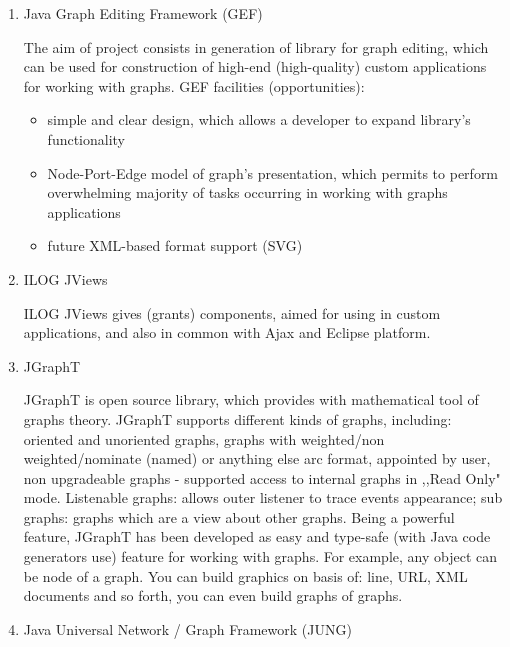 \begin{enumerate}

\item
Java Graph Editing Framework (GEF)~\cite{GEF}

The aim of project consists in generation of library for graph editing, which can be used for construction of high-end (high-quality) custom applications for working with graphs.
GEF facilities (opportunities):
\begin{itemize}
	\item simple and clear design, which allows a developer to expand library's functionality
	\item Node-Port-Edge model of graph's presentation, which permits to perform overwhelming majority of tasks occurring in working with graphs applications
	\item future XML-based format support (SVG)
\end{itemize}

\item
ILOG JViews~\cite{ILOG_Jview}

ILOG JViews gives (grants) components, aimed for using in custom applications, and also in common with Ajax and Eclipse platform.

\item
JGraphT~\cite{JGraphT}

JGraphT is open source library, which provides with mathematical tool of graphs theory. JGraphT supports different kinds of graphs, including: oriented and unoriented graphs, graphs with weighted/non weighted/nominate (named) or anything else arc format, appointed 	by user, non upgradeable graphs - supported access to internal graphs in ,,Read Only" mode. Listenable graphs: allows outer listener to trace events appearance; sub graphs: graphs which are a view about other graphs. Being a powerful feature, JGraphT has been 	developed as easy and type-safe (with Java code generators use) feature for working with 	graphs. For example, any object can be node of a graph. You can build graphics on basis of: line, URL, XML documents and so forth, you can even build graphs of graphs.

\item
Java Universal Network / Graph Framework (JUNG)~\cite{JUNG}


\end{enumerate}

